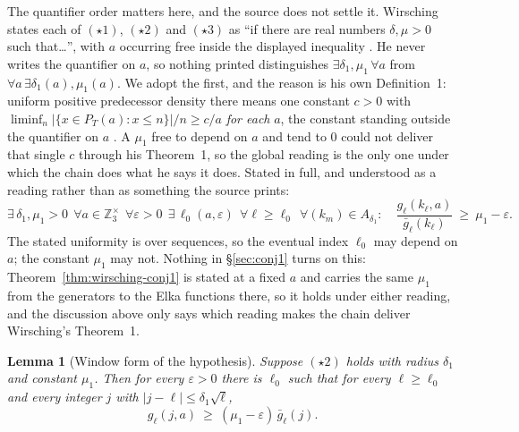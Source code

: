 \documentclass[11pt]{article}
\newtheorem{lemma}[theorem]{Lemma}
\theoremstyle{definition}
\theoremstyle{remark}
\begin{document}
The quantifier order matters here, and the source does not settle it.
Wirsching states each of $(\star1)$, $(\star2)$ and $(\star3)$ as
``if there are real numbers $\delta,\mu>0$ such that\ldots'', with $a$
occurring free inside the displayed inequality
\cite[\S\S1--3]{Wirsching2003}. He never writes the quantifier on $a$,
so nothing printed distinguishes
$\exists\delta_1,\mu_1\,\forall a$ from
$\forall a\,\exists\delta_1(a),\mu_1(a)$. We adopt the first, and the
reason is his own Definition~1: uniform positive predecessor density
there means one constant $c>0$ with
$\liminf_n|\{x\in P_T(a):x\le n\}|/n\ge c/a$ \emph{for each} $a$, the
constant standing outside the quantifier on $a$
\cite[\S1]{Wirsching2003}. A $\mu_1$ free to depend on $a$ and tend to
$0$ could not deliver that single $c$ through his Theorem~1, so the
global reading is the only one under which the chain does what he says
it does. Stated in full, and understood as a reading rather than as
something the source prints:
\[
 \exists\,\delta_1,\mu_1>0\ \ \forall a\in\mathbb Z_3^\times\ \
 \forall\varepsilon>0\ \ \exists\,\ell_0(a,\varepsilon)\ \
 \forall\ell\ge\ell_0\ \ \forall(k_m)\in A_{\delta_1}:\quad
 \frac{g_\ell(k_\ell,a)}{\bar g_\ell(k_\ell)}\ \ge\ \mu_1-\varepsilon .
\]
The stated uniformity is over sequences, so the eventual index
$\ell_0$ may depend on $a$; the constant $\mu_1$ may not. Nothing in
\S\ref{sec:conj1} turns on this: Theorem~\ref{thm:wirsching-conj1} is
stated at a fixed $a$ and carries the same $\mu_1$ from the generators
to the Elka functions there, so it holds under either reading, and the
discussion above only says which reading makes the chain deliver
Wirsching's Theorem~1.

\begin{lemma}[Window form of the hypothesis]\label{lem:window-form}
Suppose $(\star2)$ holds with radius $\delta_1$ and constant $\mu_1$.
Then for every $\varepsilon>0$ there is $\ell_0$ such that for every
$\ell\ge\ell_0$ and every integer $j$ with
$|j-\ell|\le\delta_1\sqrt\ell$,
\[
 g_\ell(j,a)\ \ge\ (\mu_1-\varepsilon)\,\bar g_\ell(j).
\]
\end{lemma}
\end{document}
